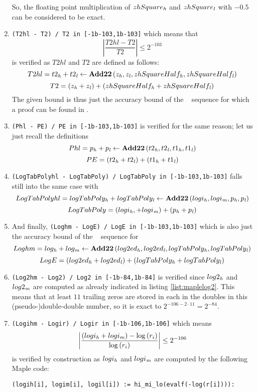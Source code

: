 \begin{enumerate}
So, the floating point multiplication of $zhSquare_{\mathit{h}}$ and $zhSquare_{\mathit{l}}$ with $-0.5$ can be considered to be exact.
\item {\tt (T2hl - T2) / T2 in [-1b-103,1b-103]} which means that 
$$\left \vert \frac{T2hl - T2}{T2} \right \vert \leq 2^{-103}$$ is verified as $T2hl$ and $T2$ are defined as follows:
$$T2hl = t2_{\mathit{h}} + t2_{\mathit{l}} \gets \mathbf{Add22} \left( z_{\mathit{h}}, z_{\mathit{l}}, zhSquareHalf_{\mathit{h}}, zhSquareHalf_{\mathit{l}} \right)$$
$$T2 = \left( z_{\mathit{h}} + z_{\mathit{l}} \right) + \left( zhSquareHalf_{\mathit{h}} + zhSquareHalf_{\mathit{l}} \right)$$
The given bound is thus just the accuracy bound of the \AddDD~ sequence for which a proof can be found in 
\cite{Lauter2005LIP:tripledouble}.
\item {\tt (Phl - PE) / PE in [-1b-103,1b-103]} is verified for the same reason; let us just recall the definitions
$$Phl = p_{\mathit{h}} + p_{\mathit{l}} \gets \mathbf{Add22} \left( t2_{\mathit{h}}, t2_{\mathit{l}}, t1_{\mathit{h}}, t1_{\mathit{l}} \right)$$
$$PE = \left( t2_{\mathit{h}} + t2_{\mathit{l}}\right) + \left( t1_{\mathit{h}} + t1_{\mathit{l}} \right)$$
\item {\tt (LogTabPolyhl - LogTabPoly) / LogTabPoly in [-1b-103,1b-103]} falls still into the same case with
$$LogTabPolyhl = logTabPoly_{\mathit{h}} + logTabPoly_{\mathit{l}} \gets \mathbf{Add22} \left( logi_{\mathit{h}}, logi_{\mathit{m}}, p_{\mathit{h}}, p_{\mathit{l}} \right)$$
$$LogTabPoly = \left( logi_{\mathit{h}}, + logi_{\mathit{m}} \right) + \left( p_{\mathit{h}} +  p_{\mathit{l}} \right)$$
\item And finally, {\tt (Loghm - LogE) / LogE in [-1b-103,1b-103]}
which is also just the accuracy bound of the \AddDD~ sequence for 
$$Loghm = log_{\mathit{h}} + log_{\mathit{m}} \gets \mathbf{Add22} \left( log2ed_{\mathit{h}}, log2ed_{\mathit{l}}, logTabPoly_{\mathit{h}}, logTabPoly_{\mathit{l}} \right)$$
$$LogE = \left( log2ed_{\mathit{h}} + log2ed_{\mathit{l}} \right) + \left( logTabPoly_{\mathit{h}} + logTabPoly_{\mathit{l}} \right)$$
\item {\tt (Log2hm - Log2) / Log2 in [-1b-84,1b-84]} is verified 
since $log2_{\mathit{h}}$ and $log2_{\mathit{m}}$ are computed as already indicated in listing \ref{list:maplelog2}.
This means that at least $11$ trailing zeros are stored in each in the doubles in this (pseudo-)double-double number, 
so it is exact to $2^{-106-2 \cdot 11} = 2^{-84}$.
\item {\tt (Logihm - Logir) / Logir in [-1b-106,1b-106]} which means
$$\left \vert \frac{\left( logi_{\mathit{h}} + logi_{\mathit{m}} \right) - \log\left( r_i \right)}{\log\left( r_i \right)} \right \vert \leq 2^{-106}$$
is verified by construction as $logi_{\mathit{h}}$ and $logi_{\mathit{m}}$ are computed by the following Maple code:
\begin{lstlisting}[caption={Maple code for computing $logi_\hi$ and $logi_\mi$},firstnumber=35]
(logih[i], logim[i], logil[i]) := hi_mi_lo(evalf(-log(r[i]))):

\end{lstlisting}
\end{enumerate}
